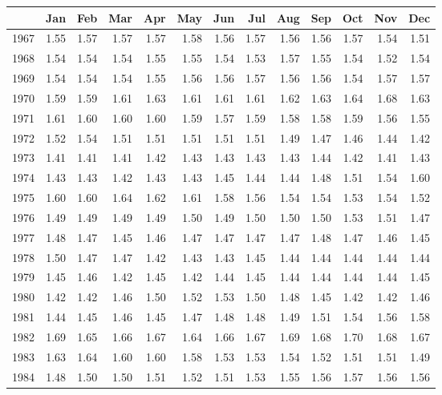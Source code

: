\begin{longtable}{rrrrrrrrrrrrr}
  \hline
 & Jan & Feb & Mar & Apr & May & Jun & Jul & Aug & Sep & Oct & Nov & Dec \\ 
  \hline
1967 & 1.55 & 1.57 & 1.57 & 1.57 & 1.58 & 1.56 & 1.57 & 1.56 & 1.56 & 1.57 & 1.54 & 1.51 \\ 
  1968 & 1.54 & 1.54 & 1.54 & 1.55 & 1.55 & 1.54 & 1.53 & 1.57 & 1.55 & 1.54 & 1.52 & 1.54 \\ 
  1969 & 1.54 & 1.54 & 1.54 & 1.55 & 1.56 & 1.56 & 1.57 & 1.56 & 1.56 & 1.54 & 1.57 & 1.57 \\ 
  1970 & 1.59 & 1.59 & 1.61 & 1.63 & 1.61 & 1.61 & 1.61 & 1.62 & 1.63 & 1.64 & 1.68 & 1.63 \\ 
  1971 & 1.61 & 1.60 & 1.60 & 1.60 & 1.59 & 1.57 & 1.59 & 1.58 & 1.58 & 1.59 & 1.56 & 1.55 \\ 
  1972 & 1.52 & 1.54 & 1.51 & 1.51 & 1.51 & 1.51 & 1.51 & 1.49 & 1.47 & 1.46 & 1.44 & 1.42 \\ 
  1973 & 1.41 & 1.41 & 1.41 & 1.42 & 1.43 & 1.43 & 1.43 & 1.43 & 1.44 & 1.42 & 1.41 & 1.43 \\ 
  1974 & 1.43 & 1.43 & 1.42 & 1.43 & 1.43 & 1.45 & 1.44 & 1.44 & 1.48 & 1.51 & 1.54 & 1.60 \\ 
  1975 & 1.60 & 1.60 & 1.64 & 1.62 & 1.61 & 1.58 & 1.56 & 1.54 & 1.54 & 1.53 & 1.54 & 1.52 \\ 
  1976 & 1.49 & 1.49 & 1.49 & 1.49 & 1.50 & 1.49 & 1.50 & 1.50 & 1.50 & 1.53 & 1.51 & 1.47 \\ 
  1977 & 1.48 & 1.47 & 1.45 & 1.46 & 1.47 & 1.47 & 1.47 & 1.47 & 1.48 & 1.47 & 1.46 & 1.45 \\ 
  1978 & 1.50 & 1.47 & 1.47 & 1.42 & 1.43 & 1.43 & 1.45 & 1.44 & 1.44 & 1.44 & 1.44 & 1.44 \\ 
  1979 & 1.45 & 1.46 & 1.42 & 1.45 & 1.42 & 1.44 & 1.45 & 1.44 & 1.44 & 1.44 & 1.44 & 1.45 \\ 
  1980 & 1.42 & 1.42 & 1.46 & 1.50 & 1.52 & 1.53 & 1.50 & 1.48 & 1.45 & 1.42 & 1.42 & 1.46 \\ 
  1981 & 1.44 & 1.45 & 1.46 & 1.45 & 1.47 & 1.48 & 1.48 & 1.49 & 1.51 & 1.54 & 1.56 & 1.58 \\ 
  1982 & 1.69 & 1.65 & 1.66 & 1.67 & 1.64 & 1.66 & 1.67 & 1.69 & 1.68 & 1.70 & 1.68 & 1.67 \\ 
  1983 & 1.63 & 1.64 & 1.60 & 1.60 & 1.58 & 1.53 & 1.53 & 1.54 & 1.52 & 1.51 & 1.51 & 1.49 \\ 
  1984 & 1.48 & 1.50 & 1.50 & 1.51 & 1.52 & 1.51 & 1.53 & 1.55 & 1.56 & 1.57 & 1.56 & 1.56 \\ 

\end{longtable}
